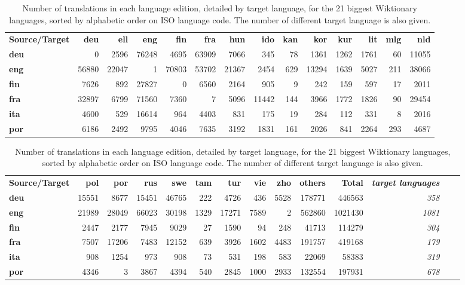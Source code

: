 \documentclass[sw]{iosart2c}
\begin{document}
\begin{table}[htb]
\begin{tabular}{lrrrrrrrrrrrrr}
\textbf{Source/Target} & \textbf{deu} & \textbf{ell} & \textbf{eng} & \textbf{fin} & \textbf{fra} & \textbf{hun} & \textbf{ido} & \textbf{kan} & \textbf{kor} & \textbf{kur} & \textbf{lit} & \textbf{mlg} & \textbf{nld}  \\
\textbf{deu} & 0 & 2596 & 76248 & 4695 & 63909 & 7066 & 345 & 78 & 1361 & 1262 & 1761 & 60 & 11055  \\
\textbf{eng} & 56880 & 22047 & 1 & 70803 & 53702 & 21367 & 2454 & 629 & 13294 & 1639 & 5027 & 211 & 38066 \\
\textbf{fin} & 7626 & 892 & 27827 & 0 & 6560 & 2164 & 905 & 9 & 242 & 159 & 597 & 17 & 2011 \\
\textbf{fra} & 32897 & 6799 & 71560 & 7360 & 7 & 5096 & 11442 & 144 & 3966 & 1772 & 1826 & 90 & 29454 \\
\textbf{ita} & 4600 & 529 & 16614 & 964 & 4403 & 831 & 175 & 19 & 284 & 112 & 331 & 8 & 2016 \\
\textbf{por} & 6186 & 2492 & 9795 & 4046 & 7635 & 3192 & 1831 & 161 & 2026 & 841 & 2264 & 293 & 4687 \\
\end{tabular}
\begin{tabular}{lrrrrrrrrrrrrr}
\textbf{Source/Target} & \textbf{pol} & \textbf{por} & \textbf{rus} & \textbf{swe} & \textbf{tam} & \textbf{tur} & \textbf{vie} & \textbf{zho}& \textbf{others} & \textbf{Total} & \textbf{\textit{target languages}}\\
\textbf{deu}  & 15551 & 8677 & 15451 & 46765 & 222 & 4726 & 436 & 5528 & 178771 & 446563 & \textit{358}\\
\textbf{eng}  & 21989 & 28049 & 66023 & 30198 & 1329 & 17271 & 7589 & 2 & 562860 & 1021430 & \textit{1081}\\
\textbf{fin} & 2447 & 2177 & 7945 & 9029 & 27 & 1590 & 94 & 248 & 41713 & 114279 & \textit{304}\\
\textbf{fra} & 7507 & 17206 & 7483 & 12152 & 639 & 3926 & 1602 & 4483 & 191757 & 419168 & \textit{179}\\
\textbf{ita} & 908 & 1254 & 973 & 908 & 73 & 531 & 198 & 583 & 22069 & 58383 & \textit{319}\\
\textbf{por} & 4346 & 3 & 3867 & 4394 & 540 & 2845 & 1000 & 2933 & 132554 & 197931 & \textit{678}\\

\end{tabular}
\caption{Number of translations in each language edition, detailed by target language, for the 21 biggest Wiktionary languages, sorted by alphabetic order on ISO language code. The number of different target language is also given.}\label{tradsize}
\end{table}
\end{document}
